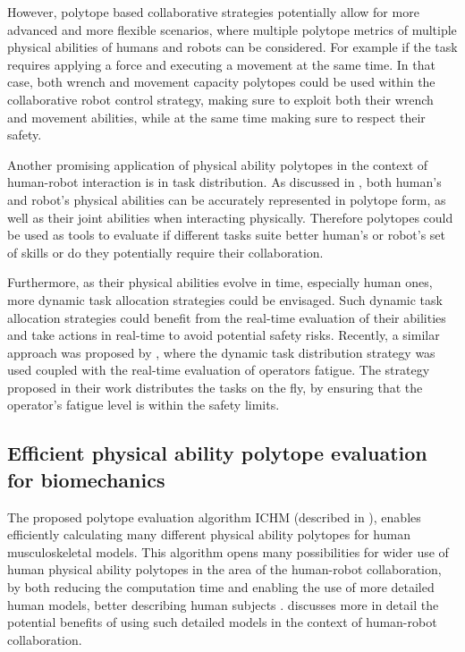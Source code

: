 However, polytope based collaborative strategies potentially allow for more advanced and more flexible scenarios, where multiple polytope metrics of multiple physical abilities of humans and robots can be considered. For example if the task requires applying a force and executing a movement at the same time. In that case, both wrench and movement capacity polytopes could be used within the collaborative robot control strategy, making sure to exploit both their wrench and movement abilities, while at the same time making sure to respect their safety.

Another promising application of physical ability polytopes in the context of human-robot interaction is in task distribution. As discussed in , both human's and robot's physical abilities can be accurately represented in polytope form, as well as their joint abilities when interacting physically. Therefore polytopes could be used as tools to evaluate if different tasks suite better human's or robot's set of skills or do they potentially require their collaboration. 

Furthermore, as their physical abilities evolve in time, especially human ones, more dynamic task allocation strategies could be envisaged. Such dynamic task allocation strategies could benefit from the real-time evaluation of their abilities and take actions in real-time to avoid potential safety risks. Recently, a similar approach was proposed by \citet{Messeri2022allocation}, where the dynamic task distribution strategy was used coupled with the real-time evaluation of operators fatigue. The strategy proposed in their work distributes the tasks on the fly, by ensuring that the operator's fatigue level is within the safety limits.  



\subsection{Efficient physical ability polytope evaluation for biomechanics}

The proposed polytope evaluation algorithm ICHM (described in ), enables efficiently calculating many different physical ability polytopes for human musculoskeletal models. 
This algorithm opens many possibilities for wider use of human physical ability polytopes in the area of the human-robot collaboration, by both reducing the computation time and enabling the use of more detailed human models, better describing human subjects \cite{sohn2019effects}.  discusses more in detail the potential benefits of using such detailed models in the context of human-robot collaboration.

